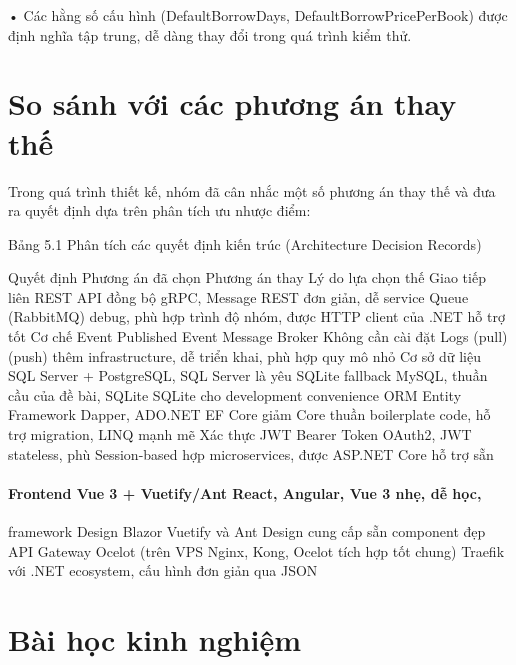 • Các hằng số cấu hình (DefaultBorrowDays, DefaultBorrowPricePerBook) được định nghĩa tập trung, dễ dàng thay đổi trong quá trình kiểm thử.

\section{So sánh với các phương án thay thế}

Trong quá trình thiết kế, nhóm đã cân nhắc một số phương án thay thế và đưa ra quyết định dựa trên phân tích ưu nhược điểm:

Bảng 5.1 Phân tích các quyết định kiến trúc (Architecture Decision Records)

Quyết định Phương án đã chọn Phương án thay Lý do lựa chọn thế Giao tiếp liên REST API đồng bộ gRPC, Message REST đơn giản, dễ service Queue (RabbitMQ) debug, phù hợp trình độ nhóm, được HTTP client của .NET hỗ trợ tốt Cơ chế Event Published Event Message Broker Không cần cài đặt Logs (pull) (push) thêm infrastructure, dễ triển khai, phù hợp quy mô nhỏ Cơ sở dữ liệu SQL Server + PostgreSQL, SQL Server là yêu SQLite fallback MySQL, thuần cầu của đề bài, SQLite SQLite cho development convenience ORM Entity Framework Dapper, ADO.NET EF Core giảm Core thuần boilerplate code, hỗ trợ migration, LINQ mạnh mẽ Xác thực JWT Bearer Token OAuth2, JWT stateless, phù Session-based hợp microservices, được ASP.NET Core hỗ trợ sẵn

\paragraph{Frontend Vue 3 + Vuetify/Ant React, Angular, Vue 3 nhẹ, dễ học,}

framework Design Blazor Vuetify và Ant Design cung cấp sẵn component đẹp API Gateway Ocelot (trên VPS Nginx, Kong, Ocelot tích hợp tốt chung) Traefik với .NET ecosystem, cấu hình đơn giản qua JSON

\section{Bài học kinh nghiệm}

